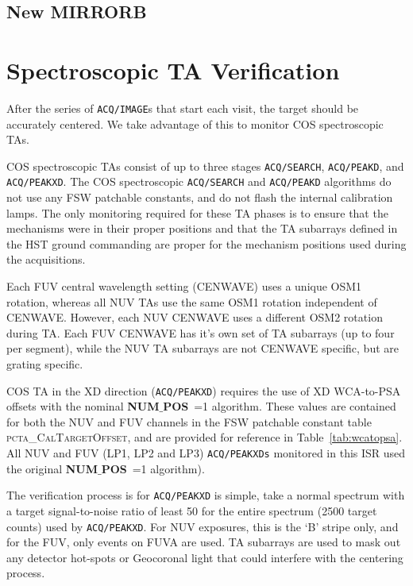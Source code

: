 \documentclass{stsci_report}
\newcommand{\tacq}[1]{\texttt{ACQ/#1}}
\begin{document}
\subsection{New MIRRORB} \label{subsec:newMIRRORB}

\normalsize
\clearpage
\section{Spectroscopic TA Verification}\label{sec:spVER}

After the series of \tacq{IMAGE}s that start each visit, the target should be accurately centered. We take advantage of this to monitor COS spectroscopic TAs.

COS spectroscopic TAs consist of up to three stages \tacq{SEARCH}, \tacq{PEAKD}, and \tacq{PEAKXD}.
The COS spectroscopic \tacq{SEARCH} and \tacq{PEAKD} algorithms do not use any FSW patchable constants, and do not flash the
internal calibration lamps. The only monitoring required for these TA phases is to ensure that the mechanisms were in their proper
positions and that the TA subarrays defined in the HST ground commanding are proper for the mechanism positions used during the acquisitions.

Each FUV central wavelength setting (CENWAVE) uses a unique OSM1 rotation, whereas all NUV TAs use the same OSM1 rotation independent of CENWAVE.
However, each NUV CENWAVE uses a different OSM2 rotation during TA. Each FUV CENWAVE has it's own set of TA subarrays (up to four per segment), while the NUV TA subarrays are not CENWAVE
specific, but are grating specific.

COS TA in the XD direction (\tacq{PEAKXD}) requires the use of XD WCA-to-PSA offsets with the nominal {{\bf NUM$\_$POS}\rm}~=1 algorithm.
These values are contained for both the NUV and FUV channels in the FSW patchable constant table \textsc{pcta\_CalTargetOffset}, and are provided for reference in Table~\ref{tab:wcatopsa}.
All NUV and FUV (LP1, LP2 and LP3) \tacq{PEAKXDs} monitored in this ISR used the original {{\bf NUM$\_$POS}\rm}~=1 algorithm).

The verification process is for \tacq{PEAKXD} is simple, take a normal spectrum with a target signal-to-noise ratio of least 50 for the entire spectrum (2500 target counts) used by \tacq{PEAKXD}.
For NUV exposures, this is the `B' stripe only, and for the FUV, only events on FUVA are used.
TA subarrays are used to mask out any detector hot-spots or Geocoronal light that could interfere with the centering process.
\end{document}
